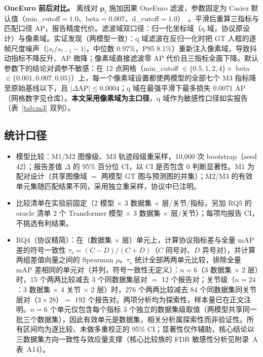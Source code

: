 \documentclass[10pt,conference]{IEEEtran}
\begin{document}
\textbf{OneEuro 前后对比。} 离线对 $\mathbf{p}_t$ 施加因果 OneEuro 滤波，参数固定为 Casiez 默认值（min\_cutoff$=1.0$、beta$=0.007$、d\_cutoff$=1.0$）~\cite{13}。平滑后重算三指标与匹配口径 AP，报告精度代价。滤波域双口径：归一化坐标域（q 域，协议原设计）与像素域。实证发现（两模型一致）：q 域滤波在反归一化时把 GT 人框的逐帧尺度噪声（$|s_t/s_{t-1}-1|$，中位数 0.97\%，P95 8.1\%）重新注入像素域，导致抖动指标不降反升、AP 微降；像素域直接滤波零 AP 代价且三指标全面下降。默认参数下的结论对调参不敏感：在 12 点网格（min\_cutoff $\in\{0.5,1,2,4\}\times$ beta $\in\{0.001,0.007,0.05\}$）上，每一个像素域设置都使两模型的全部七个 M3 指标降至原始基线以下，且 $|\Delta\mathrm{AP}|\le 0.0004$；q 域在最强平滑下最多损失 0.0071 AP（网格数字见仓库）。\textbf{本文采用像素域为主口径}，q 域作为敏感性口径如实报告（表~\ref{tab:m3} 双列）。

\subsection{统计口径}

\begin{itemize}
\item 模型比较：M1/M2 图像级、M3 轨迹段级重采样，10,000 次 bootstrap（seed 42）；报告差值 $\Delta$ 的 95\% 百分位 CI，以 CI 是否包含 0 判断显著性。M1 为配对设计（共享图像域 $=$ 两模型 GT 图与预测图的并集）；M2/M3 的有效单元集随匹配结果不同，采用独立重采样，协议中已注明。
\item 比较清单在实验前固定（2 模型 $\times$ 3 数据集 $\times$ 层/关节/指标，另加 RQ5 的 oracle 清单 2 个 Transformer 模型 $\times$ 3 数据集 $\times$ 层/关节）；每项均报告 CI，不挑选有利结果。
\item RQ4（协议精简）：在（数据集 $\times$ 层）单元上，计算协议指标差与全量 mAP 差的符号一致性 $\tau_s=(C-D)/(C+D)$（$C$ 同号对、$D$ 异号对），并计算两组差值向量之间的 Spearman $\rho$。$\tau_s$ 统计全部两两单元比较，排除全量 mAP 差相同的单元对（并列，符号一致性无定义）：$n=6$（3 数据集 $\times$ 2 层）时，15 个两两比较减去 3 个同数据集层对 $=$ 12 个报告对；关节级（$n=24$：3 数据集 $\times$ 4 关节 $\times$ 2 层）时，276 个两两比较减去 84 个同数据集同关节层对（$3\times28$）$=$ 192 个报告对。两项分析均为探索性，样本量已在正文注明。$n=6$ 个单元仅包含每个指标 3 个独立的数据集级取值（两模型共享同一批三个数据集），因此有效单元是数据集，相关分析属探索性而非验证性。所有区间均为逐比较、未做多重校正的 95\% CI；显著性仅作辅助，核心结论以三数据集方向一致性与效应量支撑（核心比较族的 FDR 敏感性分析见附录~A 表~A14）。
\end{itemize}
\end{document}
